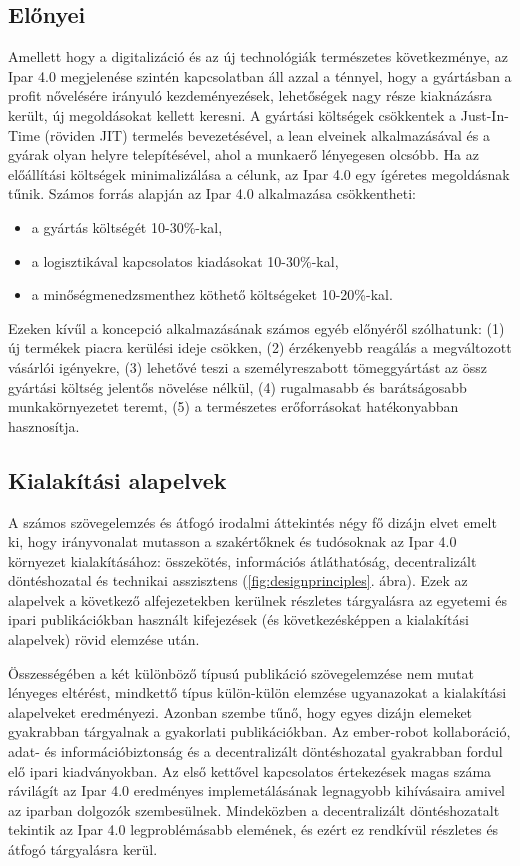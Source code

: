 \documentclass[../documentation.tex]{subfiles}
\begin{document}
\subsection{Előnyei}
Amellett hogy a digitalizáció és az új technológiák természetes következménye, az Ipar 4.0 megjelenése szintén kapcsolatban áll azzal a ténnyel, hogy a gyártásban a profit nővelésére irányuló kezdeményezések, lehetőségek nagy része kiaknázásra került, új megoldásokat kellett keresni. A gyártási költségek csökkentek a Just-In-Time (röviden JIT) termelés bevezetésével, a lean elveinek alkalmazásával és a gyárak olyan helyre telepítésével, ahol a munkaerő lényegesen olcsóbb. Ha az előállítási költségek minimalizálása a célunk, az Ipar 4.0 egy ígéretes megoldásnak tűnik. Számos forrás alapján az Ipar 4.0 alkalmazása csökkentheti\cite{industryresults}:
\begin{itemize}
	\item a gyártás költségét 10-30\%-kal,
	\item a logisztikával kapcsolatos kiadásokat 10-30\%-kal,
	\item a minőségmenedzsmenthez köthető költségeket 10-20\%-kal.
\end{itemize}

Ezeken kívűl a koncepció alkalmazásának számos egyéb előnyéről szólhatunk: (1) új termékek piacra kerülési ideje csökken, (2) érzékenyebb reagálás a megváltozott vásárlói igényekre, (3) lehetővé teszi a személyreszabott tömeggyártást az össz gyártási költség jelentős növelése nélkül, (4) rugalmasabb és barátságosabb munkakörnyezetet teremt, (5) a természetes erőforrásokat hatékonyabban hasznosítja.

\subsection{Kialakítási alapelvek}
A számos szövegelemzés és átfogó irodalmi áttekintés négy fő dizájn elvet emelt ki, hogy irányvonalat mutasson a szakértőknek és tudósoknak az Ipar 4.0 környezet kialakításához: összekötés, információs átláthatóság, decentralizált döntéshozatal és technikai asszisztens (\ref{fig:designprinciples}. ábra). Ezek az alapelvek a következő alfejezetekben kerülnek részletes tárgyalásra az egyetemi és ipari publikációkban használt kifejezések (és következésképpen a kialakítási alapelvek) rövid elemzése után.

Összességében a két különböző típusú publikáció szövegelemzése nem mutat lényeges eltérést, mindkettő típus külön-külön elemzése ugyanazokat a kialakítási alapelveket eredményezi. Azonban szembe tűnő, hogy egyes dizájn elemeket gyakrabban tárgyalnak a gyakorlati publikációkban. Az ember-robot kollaboráció, adat- és információbiztonság és a decentralizált döntéshozatal gyakrabban fordul elő ipari kiadványokban. Az első kettővel kapcsolatos értekezések magas száma rávilágít az Ipar 4.0 eredményes implemetálásának legnagyobb kihívásaira amivel az iparban dolgozók szembesülnek. Mindeközben a decentralizált döntéshozatalt tekintik az Ipar 4.0 legproblémásabb elemének, és ezért ez rendkívül részletes és átfogó tárgyalásra kerül.
\end{document}
